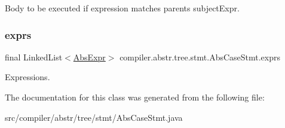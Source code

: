 Body to be executed if expression matches parent\textquotesingle{}s subject\+Expr. \mbox{\label{classcompiler_1_1abstr_1_1tree_1_1stmt_1_1_abs_case_stmt_a3fd4efb25dcdc2e9cf82ce9a3227b9d9}} 
\subsubsection{\texorpdfstring{exprs}{exprs}}
{\footnotesize\ttfamily final Linked\+List$<$\hyperlink{classcompiler_1_1abstr_1_1tree_1_1expr_1_1_abs_expr}{Abs\+Expr}$>$ compiler.\+abstr.\+tree.\+stmt.\+Abs\+Case\+Stmt.\+exprs}

Expressions. 

The documentation for this class was generated from the following file\+:\begin{DoxyCompactItemize}
\item 
src/compiler/abstr/tree/stmt/Abs\+Case\+Stmt.\+java\end{DoxyCompactItemize}
